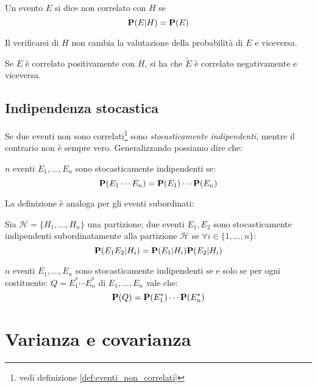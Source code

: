 \begin{definition}
  \label{def:eventi_non_correlati}
  Un evento $E$ si dice non correlato con $H$ se
  \[ \mathbf{P}(E|H) = \mathbf{P}(E) \]

  Il verificarsi di $H$ non cambia la valutazione della probabilità di $E$ e viceversa.
\end{definition}

Se $E$ è correlato positivamente con $H$, si ha che \( \tilde{E} \) è correlato negativamente e viceversa. %

\subsection{Indipendenza stocastica}
Se due eventi non sono correlati\footnote{vedi definizione \ref{def:eventi_non_correlati}} sono \emph{stocasticamente indipendenti}, mentre il contrario non è sempre vero.
Generalizzando possiamo dire che:
\begin{definition}
  $n$ eventi \( E_1, \ldots, E_n \) sono stocasticamente indipendenti se:
  \[ \mathbf{P}(E_1 \cdots E_n) = \mathbf{P}(E_1) \cdots \mathbf{P}(E_n) \]
\end{definition}

La definizione è analoga per gli eventi subordinati:
\begin{definition}
  Sia \( \mathcal{H} = \{ H_1, \ldots, H_n \} \) una partizione; due eventi \( E_1, E_2 \) sono stocasticamente indipendenti subordinatamente alla partizione \( \mathcal{H} \) se \( \forall i \in \{1,\ldots,n\} \):
  \[ \mathbf{P}(E_1 E_2 | H_i) = \mathbf{P}(E_1 | H_i)\mathbf{P}(E_2|H_i) \]
\end{definition}

\begin{definition}
  $n$ eventi \( E_1, \ldots, E_n \) sono stocasticamente indipendenti se e solo se per ogni costituente:
  \( Q = E_1^* \cdots E_n^* \) di \( E_1, \ldots, E_n \) vale che:
  \[ \mathbf{P}(Q) = \mathbf{P}(E_1^*) \cdots \mathbf{P}(E_n^*) \]
\end{definition}

\section{Varianza e covarianza}
